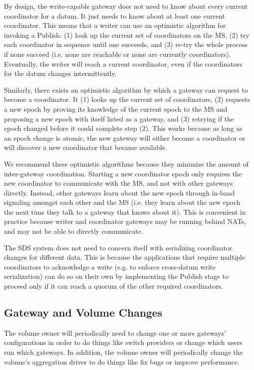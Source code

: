 By design, the write-capable gateway does not need to know
about every current coordinator for a datum.  It just needs to know about
at least one current coordinator.  This means that a writer can use an
optimistic algorithm for invoking a Publish: 
(1) look up the current set of coordinators on the MS, (2) try each coordinator in
sequence until one succeeds, and (3) re-try the whole process if none
succeed (i.e. none are reachable or none are currently coordinators).
Eventually, the writer will reach a current coordinator, even if the
coordinators for the datum changes intermittently.

Similarly, there exists an optimistic algorithm by which a gateway can request
to become a coordinator.  It (1) looks up the current set of coordinators, (2)
requests a new epoch by proving its knowledge of the current epoch to the MS
and proposing a new epoch with itself listed as a gateway, and (3) retrying if the epoch
changed before it could complete step (2).  This works because as long as an epoch change
is atomic, the new gateway will either become a coordinator or will discover a
new coordinator that became available.

We recommend these optimistic algorithms because they minimize the
amount of inter-gateway coordination.  Starting a new coordinator
epoch only requires the new coordinator to communicate with the MS, and not with
other gateways directly.  Instead,
other gateways learn about the new epoch through in-band signaling amongst each
other and the MS (i.e. they learn about the new epoch the next time they talk to
a gateway that knows about it).  This is convenient in practice because writer
and coordinator gateways may be running behind NATs, and may not be able to
directly communicate.

The SDS system does not need to concern itself with serializing coordinator
changes for different data.  This is because the applications that require
multiple coordinators to acknowledge a write (e.g. to enforce cross-datum write
serialization) can do so on their own by implementing the
Publish stage to proceed only if it can reach a quorum of the other required
coordinators.

\subsection{Gateway and Volume Changes}

The volume owner will periodically need to change one or more gateways'
configurations in order to do things like switch providers or change
which users run which gateways.  In addition, the volume owner will periodically
change the volume's aggregation driver to do things like fix bugs or improve
performance.

